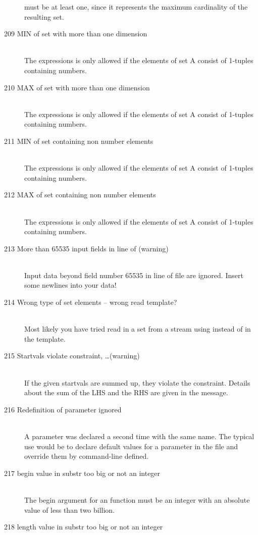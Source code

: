 \begin{description}
   must be at least one, since it represents the maximum cardinality
   of the resulting set.
\item[209 MIN of set with more than one dimension]\ \\
   The expressions  is only allowed if the elements of 
   set A consist of 1-tuples containing numbers.  
\item[210 MAX of set with more than one dimension]\ \\
   The expressions  is only allowed if the elements of 
   set A consist of 1-tuples containing numbers.  
\item[211 MIN of set containing non number elements]\ \\
   The expressions  is only allowed if the elements of 
   set A consist of 1-tuples containing numbers.  
\item[212 MAX of set containing non number elements]\ \\
   The expressions  is only allowed if the elements of 
   set A consist of 1-tuples containing numbers.  
\item[213 More than 65535 input fields in line \code{xxx} of
   \code{yyy} (warning)]\ \\
   Input data beyond field number 65535 in line  of file
    are ignored. Insert some newlines into your data!
\item[214 Wrong type of set elements -- wrong read template?]\ \\
   Most likely you have tried read in a set from a stream using
    instead of  in the template. 
\item[215 Startvals violate constraint, \ldots (warning)]\ \\
   If the given startvals are summed up, they violate the
   constraint. Details about the sum of the LHS and the RHS are given
   in the message.
\item[216 Redefinition of parameter \code{xxx} ignored]\ \\
   A parameter was declared a second time with the same name. The
   typical use would be to declare default values for a parameter in
   the \zimpl file and override them by command-line defined.
\item[217 begin value \code{xxx} in substr too big or not an integer]\ \\
   The begin argument for an  function
   must be an integer with an absolute value of less than two billion.
\item[218 length value \code{xxx} in substr too big or not an integer]\ \\

\end{description}
